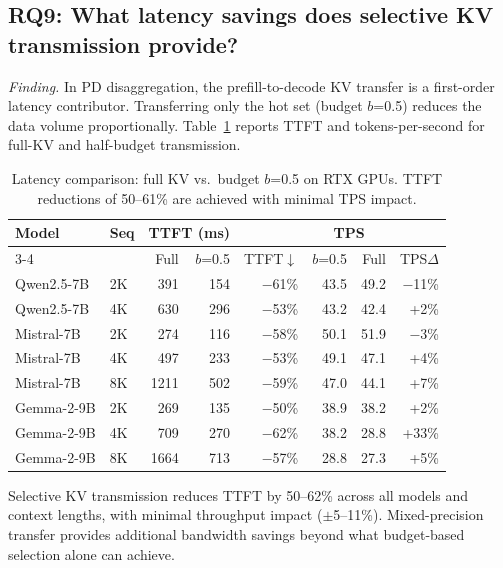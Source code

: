 \documentclass[11pt]{article}
\newcommand{\pct}{\%}
\theoremstyle{definition}
\theoremstyle{plain}
\begin{document}
\subsection{RQ9: What latency savings does selective KV transmission provide?}
\label{sec:rq9}

\emph{Finding.}  In PD disaggregation, the prefill-to-decode KV transfer is a first-order latency contributor.  Transferring only the hot set (budget $b$=0.5) reduces the data volume proportionally.  Table~\ref{tab:latency} reports TTFT and tokens-per-second for full-KV and half-budget transmission.

\begin{table}[t]
\centering
\caption{Latency comparison: full KV vs.\ budget $b$=0.5 on RTX GPUs.  TTFT reductions of 50--61\pct{} are achieved with minimal TPS impact.}
\label{tab:latency}
\small
\begin{tabular}{llrrrrrr}
\toprule
Model & Seq & \multicolumn{2}{c}{TTFT (ms)} & & \multicolumn{2}{c}{TPS} & \\
\cmidrule{3-4} \cmidrule{6-7}
 & & Full & $b$=0.5 & TTFT$\downarrow$ & $b$=0.5 & Full & TPS$\Delta$ \\
\midrule
Qwen2.5-7B & 2K & 391 & 154 & $-$61\pct{} & 43.5 & 49.2 & $-$11\pct{} \\
Qwen2.5-7B & 4K & 630 & 296 & $-$53\pct{} & 43.2 & 42.4 & +2\pct{} \\
\midrule
Mistral-7B & 2K & 274 & 116 & $-$58\pct{} & 50.1 & 51.9 & $-$3\pct{} \\
Mistral-7B & 4K & 497 & 233 & $-$53\pct{} & 49.1 & 47.1 & +4\pct{} \\
Mistral-7B & 8K & 1211 & 502 & $-$59\pct{} & 47.0 & 44.1 & +7\pct{} \\
\midrule
Gemma-2-9B & 2K & 269 & 135 & $-$50\pct{} & 38.9 & 38.2 & +2\pct{} \\
Gemma-2-9B & 4K & 709 & 270 & $-$62\pct{} & 38.2 & 28.8 & +33\pct{} \\
Gemma-2-9B & 8K & 1664 & 713 & $-$57\pct{} & 28.8 & 27.3 & +5\pct{} \\
\bottomrule
\end{tabular}
\end{table}

Selective KV transmission reduces TTFT by 50--62\pct{} across all models and context lengths, with minimal throughput impact ($\pm$5--11\pct{}).  Mixed-precision transfer provides additional bandwidth savings beyond what budget-based selection alone can achieve.
\end{document}
